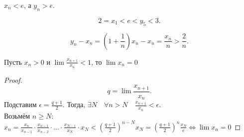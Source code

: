 \documentclass[11pt, oneside]{article}   	%
\begin{document}
\begin{tlemma}
    $x_n < e$, а  $y_n>e$.
\end{tlemma}
\begin{tlemma}
    \[ 2 = x_1 < e < y_5 < 3 .\] 
\end{tlemma}
\begin{dlemma}
    \[ y_n - x_n = (1+\frac{1}{n})x_n - x_n = \frac{x_n}{n} > \frac{2}{n} .\] 
\end{dlemma}
\begin{theorem}
    Пусть $x_n>0$ и  $\lim \frac{x_{n+1}}{x_n} < 1$, то $\lim x_n = 0$
     \begin{proof}
         \[ q = \lim \frac{x_{n+1}}{x_n} .\] 
         Подставим $\epsilon = \frac{q+1}{2}$. Тогда,  $\exists{N}\quad \forall{n>N}\quad \frac{x_{n+1}}{x_n} < \epsilon$.\\
         Возьмём $n\ge N$: $x_n = \frac{x_n}{x_{n-1}}\cdot \frac{x_{n-1}}{x_{n-2}} \cdot \ldots \cdot \frac{x_{N-1}}{x_N} \cdot  x_N < \left( \frac{q+1}{2} \right)^{n-N}x_N = \left(\frac{q+1}{2}\right)^{n}\frac{x_N}{c} \iff \lim x_n = 0 $
    \end{proof}
\end{theorem}
\end{document}
